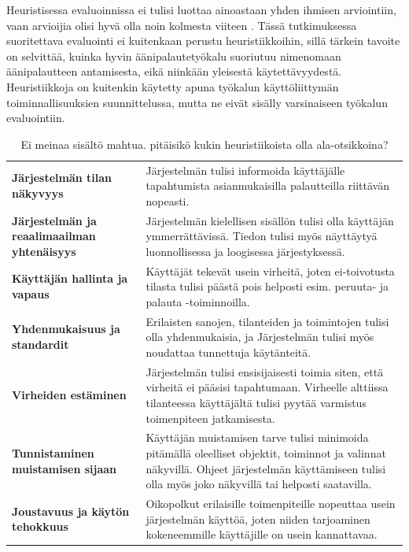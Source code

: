 \documentclass[utf8]{gradu3}
\begin{document}
Heuristisessa evaluoinnissa ei tulisi luottaa ainoastaan yhden ihmisen arviointiin, vaan arvioijia olisi hyvä olla noin kolmesta viiteen \parencite[][]{heuristic-evaluation}. Tässä tutkimuksessa suoritettava evaluointi ei kuitenkaan perustu heuristiikkoihin, sillä tärkein tavoite on selvittää, kuinka hyvin äänipalautetyökalu suoriutuu nimenomaan äänipalautteen antamisesta, eikä niinkään yleisestä käytettävyydestä. Heuristiikkoja on kuitenkin käytetty apuna työkalun käyttöliittymän toiminnallisuuksien suunnittelussa, mutta ne eivät sisälly varsinaiseen työkalun evaluointiin.


\begin{table}[H]
  \centering
  \caption{Ei meinaa sisältö mahtua. pitäisikö kukin heuristiikoista olla ala-otsikkoina?}
    \begin{tabular}{p{12.355em}p{21.855em}}
    \multicolumn{1}{l}{\textbf{Järjestelmän tilan näkyvyys}} & Järjestelmän tulisi informoida käyttäjälle tapahtumista asianmukaisilla palautteilla riittävän nopeasti. \\
    \textbf{Järjestelmän ja reaalimaailman yhtenäisyys} & Järjestelmän kielellisen sisällön tulisi olla käyttäjän ymmerrättävissä. Tiedon tulisi myös näyttäytyä luonnollisessa ja loogisessa järjestyksessä. \\
    \multicolumn{1}{l}{\textbf{Käyttäjän hallinta ja vapaus}} & Käyttäjät tekevät usein virheitä, joten ei-toivotusta tilasta tulisi päästä pois helposti esim. peruuta- ja palauta -toiminnoilla. \\
    \multicolumn{1}{l}{\textbf{Yhdenmukaisuus ja standardit}} & Erilaisten sanojen, tilanteiden ja toimintojen tulisi olla yhdenmukaisia, ja Järjestelmän tulisi myös noudattaa tunnettuja käytänteitä. \\
    \multicolumn{1}{l}{\textbf{Virheiden estäminen}} & Järjestelmän tulisi ensisijaisesti toimia siten, että virheitä ei pääsisi tapahtumaan. Virheelle alttiissa tilanteessa käyttäjältä tulisi pyytää varmistus toimenpiteen jatkamisesta. \\
    \textbf{Tunnistaminen muistamisen sijaan} & Käyttäjän muistamisen tarve tulisi minimoida pitämällä oleelliset objektit, toiminnot ja valinnat näkyvillä. Ohjeet järjestelmän käyttämiseen tulisi olla myös joko näkyvillä tai helposti saatavilla. \\
    \multicolumn{1}{l}{\textbf{Joustavuus ja käytön tehokkuus}} & Oikopolkut erilaisille toimenpiteille nopeuttaa usein järjestelmän käyttöä, joten niiden tarjoaminen kokeneemmille käyttäjille on usein kannattavaa.  \\

\end{tabular}
\end{table}
\end{document}
